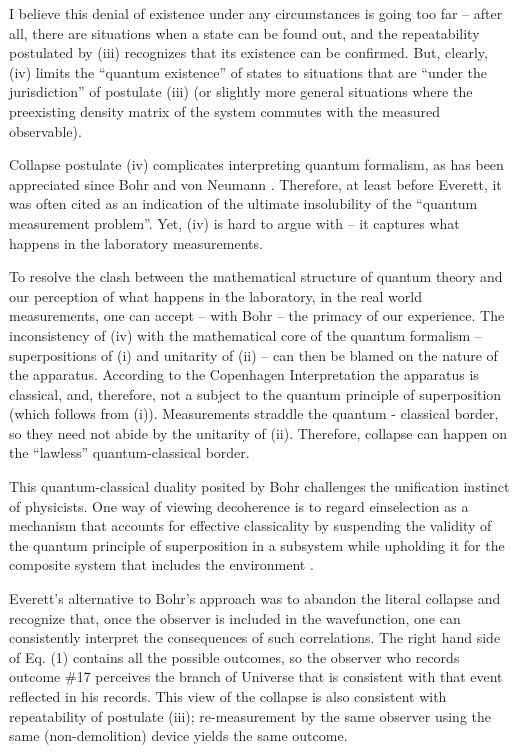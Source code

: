 \documentclass[aps,amsmath,amssymb,amsfonts,12pt]{revtex4-1}
\newcommand{\+}         {\dagger}
\begin{document}
I believe this denial of existence under any circumstances is going
too far -- after all, there are situations when a state can be found out, and the repeatability postulated by (iii) recognizes that its existence can be confirmed. But, clearly, (iv) limits the ``quantum existence'' of states to situations that are ``under the jurisdiction'' of postulate (iii) (or slightly more general situations where the preexisting density matrix
of the system commutes with the measured observable).

Collapse postulate (iv) complicates interpreting quantum formalism, as has been appreciated since Bohr and von Neumann \cite{11,59}. Therefore, at least before Everett, it was often cited as an indication of the ultimate insolubility of the ``quantum measurement problem''.
Yet, (iv) is hard to argue with -- it captures what happens in the laboratory measurements. 

To resolve the clash between the mathematical structure of quantum theory and our perception of what happens in the laboratory, in the real world measurements, one can accept 
-- with Bohr -- the primacy of our experience. The inconsistency of (iv) with the mathematical core of the quantum formalism -- superpositions of (i) and unitarity of (ii) -- can then be blamed
on the nature of the apparatus. According to the Copenhagen Interpretation the apparatus is classical, and,
therefore, not a subject to the quantum principle of superposition (which
follows from (i)). 
Measurements straddle the quantum - classical border, so they need not abide by the unitarity of (ii). Therefore, collapse can happen on the ``lawless'' quantum-classical border.

This quantum-classical duality posited by Bohr challenges the unification instinct of physicists.
One way of viewing decoherence is to regard einselection as a mechanism that accounts for effective classicality by suspending the validity of the quantum  
principle of superposition in a subsystem while upholding it for the composite system that includes the environment \cite{71,75}.

Everett's alternative to Bohr's approach was to abandon the literal
collapse and recognize that, once the observer is included
in the wavefunction, one can consistently interpret the consequences of such correlations. 
The right hand side of Eq. (1) contains all the possible outcomes, so the observer who records 
outcome \#17 perceives the branch of Universe that is consistent with that event reflected 
in his records. This view of the collapse is also consistent with repeatability of postulate (iii);  
re-measurement by the same observer using the same (non-demolition) device yields the same outcome.
\end{document}

